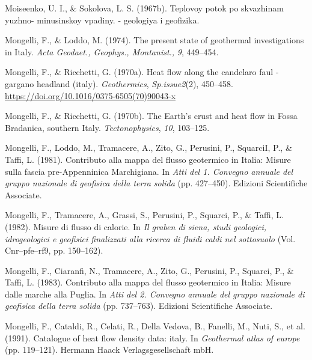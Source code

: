 \begin{CSLReferences}{1}{1}
\leavevmode{}%
Moiseenko, U. I., \& Sokolova, L. S. (1967b). Teplovoy potok po skvazhinam yuzhno- minusinskoy vpadiny. - geologiya i geofizika.

\leavevmode{}%
Mongelli, F., \& Loddo, M. (1974). The present state of geothermal investigations in {Italy}. \emph{Acta Geodaet., Geophys., Montanist.,} \emph{9}, 449--454.

\leavevmode{}%
Mongelli, F., \& Ricchetti, G. (1970a). Heat flow along the candelaro faul - gargano headland (italy). \emph{Geothermics}, \emph{Sp.issue2}(2), 450--458. \url{https://doi.org/10.1016/0375-6505(70)90043-x}

\leavevmode{}%
Mongelli, F., \& Ricchetti, G. (1970b). The {Earth's} crust and heat flow in {Fossa Bradanica, southern Italy}. \emph{Tectonophysics}, \emph{10}, 103--125.

\leavevmode{}%
Mongelli, F., Loddo, M., Tramacere, A., Zito, G., Perusini, P., SquarciI, P., \& Taffi, L. (1981). Contributo alla mappa del flusso geotermico in {Italia}: Misure sulla fascia pre-{Appenninica Marchigiana}. In \emph{Atti del 1. Convegno annuale del gruppo nazionale di geofisica della terra solida} (pp. 427--450). Edizioni Scientifiche Associate.

\leavevmode{}%
Mongelli, F., Tramacere, A., Grassi, S., Perusini, P., Squarci, P., \& Taffi, L. (1982). Misure di flusso di calorie. In \emph{Il graben di siena, studi geologici, idrogeologici e geofisici finalizzati alla ricerca di fluidi caldi nel sottosuolo} (Vol. Cnr--pfe--rf9, pp. 150--162).

\leavevmode{}%
Mongelli, F., Ciaranfi, N., Tramacere, A., Zito, G., Perusini, P., Squarci, P., \& Taffi, L. (1983). Contributo alla mappa del flusso geotermico in {Italia}: Misure dalle marche alla {Puglia}. In \emph{Atti del 2. Convegno annuale del gruppo nazionale di geofisica della terra solida} (pp. 737--763). Edizioni Scientifiche Associate.

\leavevmode{}%
Mongelli, F., Cataldi, R., Celati, R., Della Vedova, B., Fanelli, M., Nuti, S., et al. (1991). Catalogue of heat flow density data: italy. In \emph{Geothermal atlas of europe} (pp. 119--121). Hermann Haack Verlagsgesellschaft mbH.


\end{CSLReferences}
